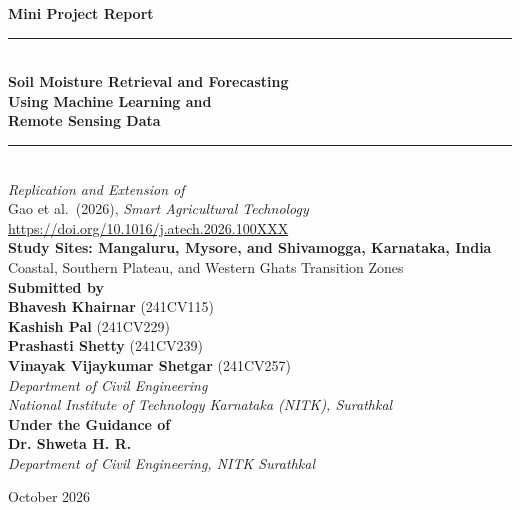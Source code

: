 \documentclass[12pt, a4paper]{article}
\begin{document}
\begin{titlepage}
    \centering
    \vspace*{2cm}
    
    {\Large \textbf{Mini Project Report}}\\[0.5cm]
    \rule{\textwidth}{1.5pt}\\[0.8cm]
    
    {\Huge \textbf{Soil Moisture Retrieval and Forecasting\\[0.3cm]
    Using Machine Learning and\\[0.3cm]
    Remote Sensing Data}}\\[0.8cm]
    
    \rule{\textwidth}{1.5pt}\\[1.5cm]
    
    {\large \textit{Replication and Extension of}}\\[0.3cm]
    {\large Gao et al.\ (2026), \textit{Smart Agricultural Technology}}\\[0.3cm]
    {\small \url{https://doi.org/10.1016/j.atech.2026.100XXX}}\\[2cm]
    
    {\Large \textbf{Study Sites: Mangaluru, Mysore, and Shivamogga, Karnataka, India}}\\[0.3cm]
    {\large Coastal, Southern Plateau, and Western Ghats Transition Zones}\\[2.5cm]
    
    {\large
    \textbf{Submitted by}\\[0.3cm]
    \textbf{Bhavesh Khairnar} (241CV115)\\
    \textbf{Kashish Pal} (241CV229)\\
    \textbf{Prashasti Shetty} (241CV239)\\
    \textbf{Vinayak Vijaykumar Shetgar} (241CV257)\\[0.3cm]
    \textit{Department of Civil Engineering}\\
    \textit{National Institute of Technology Karnataka (NITK), Surathkal}\\[1.2cm]
    \textbf{Under the Guidance of}\\[0.3cm]
    \textbf{Dr. Shweta H. R.}\\
    \textit{Department of Civil Engineering, NITK Surathkal}\\[1.2cm]
    }
    
    {\large October 2026}
\end{titlepage}
\end{document}
